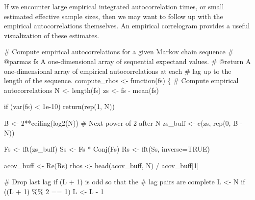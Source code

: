 \documentclass[
  letterpaper,
  DIV=11,
  numbers=noendperiod]{scrartcl}
\newenvironment{Shaded}{\begin{snugshade}}{\end{snugshade}}
\newcommand{\CommentTok}[1]{\textcolor[rgb]{0.37,0.37,0.37}{#1}}
\newcommand{\ControlFlowTok}[1]{\textcolor[rgb]{0.00,0.23,0.31}{#1}}
\newcommand{\DecValTok}[1]{\textcolor[rgb]{0.68,0.00,0.00}{#1}}
\newcommand{\FloatTok}[1]{\textcolor[rgb]{0.68,0.00,0.00}{#1}}
\newcommand{\NormalTok}[1]{\textcolor[rgb]{0.00,0.23,0.31}{#1}}
\newcommand{\OperatorTok}[1]{\textcolor[rgb]{0.37,0.37,0.37}{#1}}
\begin{document}
If we encounter large empirical integrated autocorrelation times, or
small estimated effective sample sizes, then we may want to follow up
with the empirical autocorrelations themselves. An empirical correlogram
provides a useful visualization of these estimates.

\begin{Shaded}
\begin{Highlighting}[]
\CommentTok{\# Compute empirical autocorrelations for a given Markov chain sequence}
\CommentTok{\# @parmas fs A one{-}dimensional array of sequential expectand values.}
\CommentTok{\# @return A one{-}dimensional array of empirical autocorrelations at each}
\CommentTok{\#         lag up to the length of the sequence.}
\NormalTok{compute\_rhos }\OperatorTok{\textless{}{-}}\NormalTok{ function(fs) \{}
  \CommentTok{\# Compute empirical autocorrelations}
\NormalTok{  N }\OperatorTok{\textless{}{-}}\NormalTok{ length(fs)}
\NormalTok{  zs }\OperatorTok{\textless{}{-}}\NormalTok{ fs }\OperatorTok{{-}}\NormalTok{ mean(fs)}
  
  \ControlFlowTok{if}\NormalTok{ (var(fs) }\OperatorTok{\textless{}} \FloatTok{1e{-}10}\NormalTok{)}
    \ControlFlowTok{return}\NormalTok{(rep(}\DecValTok{1}\NormalTok{, N))}

\NormalTok{  B }\OperatorTok{\textless{}{-}} \DecValTok{2}\OperatorTok{**}\NormalTok{ceiling(log2(N)) }\CommentTok{\# Next power of 2 after N}
\NormalTok{  zs\_buff }\OperatorTok{\textless{}{-}}\NormalTok{ c(zs, rep(}\DecValTok{0}\NormalTok{, B }\OperatorTok{{-}}\NormalTok{ N))}

\NormalTok{  Fs }\OperatorTok{\textless{}{-}}\NormalTok{ fft(zs\_buff)}
\NormalTok{  Ss }\OperatorTok{\textless{}{-}}\NormalTok{ Fs }\OperatorTok{*}\NormalTok{ Conj(Fs)}
\NormalTok{  Rs }\OperatorTok{\textless{}{-}}\NormalTok{ fft(Ss, inverse}\OperatorTok{=}\NormalTok{TRUE)}

\NormalTok{  acov\_buff }\OperatorTok{\textless{}{-}}\NormalTok{ Re(Rs)}
\NormalTok{  rhos }\OperatorTok{\textless{}{-}}\NormalTok{ head(acov\_buff, N) }\OperatorTok{/}\NormalTok{ acov\_buff[}\DecValTok{1}\NormalTok{]}

  \CommentTok{\# Drop last lag if (L + 1) is odd so that the}
  \CommentTok{\# lag pairs are complete}
\NormalTok{  L }\OperatorTok{\textless{}{-}}\NormalTok{ N}
  \ControlFlowTok{if}\NormalTok{ ((L }\OperatorTok{+} \DecValTok{1}\NormalTok{) }\OperatorTok{\%\%} \DecValTok{2} \OperatorTok{==} \DecValTok{1}\NormalTok{)}
\NormalTok{    L }\OperatorTok{\textless{}{-}}\NormalTok{ L }\OperatorTok{{-}} \DecValTok{1}


\end{Highlighting}
\end{Shaded}
\end{document}
